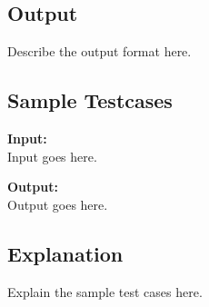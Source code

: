 \documentclass[12pt]{article}
\begin{document}
\subsection*{Output}
Describe the output format here.

\subsection*{Sample Testcases}
\textbf{Input:} \\
Input goes here.

\textbf{Output:} \\
Output goes here.

\subsection*{Explanation}
Explain the sample test cases here.
\end{document}
